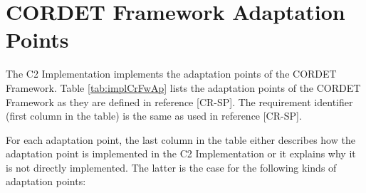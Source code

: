 \documentclass{pnp_article}
\begin{document}
\begin{landscape}


\end{landscape}





\section{CORDET Framework Adaptation Points}\label{sec:implCrFwAp}
The C2 Implementation implements the adaptation points of the CORDET Framework.
Table \ref{tab:implCrFwAp} lists the adaptation points of the CORDET Framework as they are defined in reference [CR-SP]. The requirement identifier (first column in the table) is the same as used in reference [CR-SP]. 

For each adaptation point, the last column in the table either describes how the adaptation point is implemented in the C2 Implementation or it explains why it is not directly implemented. The latter is the case for the following kinds of adaptation points:
\end{document}
